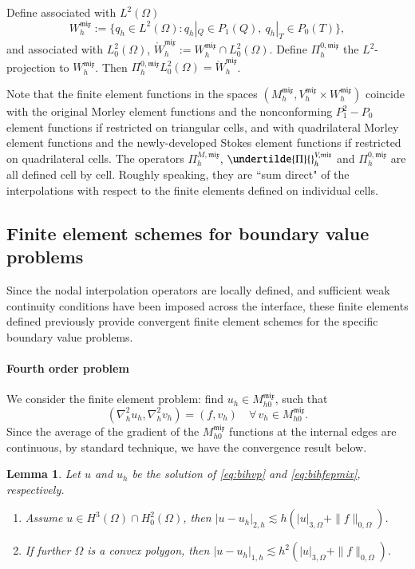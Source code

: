 \documentclass[12pt,showkeys]{amsart}
\newtheorem{lemma}[theorem]{Lemma}
\begin{document}
Define associated with $L^2(\Omega)$
$$
W_h^{\mathfrak{mix}}:=\{q_h\in L^2(\Omega):q_h|_Q\in P_1(Q),\ q_h|_T\in P_0(T)\},
$$
and associated with $L^2_0(\Omega)$, $\mathring{W}_h^{\mathfrak{mix}}:=W_h^{\mathfrak{mix}}\cap L^2_0(\Omega).$ Define $\Pi_h^{0,{\mathfrak{mix}}}$ the $L^2$-projection to $W_h^{\mathfrak{mix}}$. Then $\Pi_h^{0,{\mathfrak{mix}}} L^2_0(\Omega)=\mathring{W}_h^{\mathfrak{mix}}$.

Note that the finite element functions in the spaces $(M_h^{\mathfrak{mix}},V_h^{\mathfrak{mix}}\times W_h^{\mathfrak{mix}})$ coincide with the original Morley element functions and the nonconforming $P_1^2-P_0$ element functions if restricted on triangular cells, and with quadrilateral Morley element functions and the newly-developed Stokes element functions if restricted on quadrilateral cells.  The operators $\Pi_h^{M,{\mathfrak{mix}}}$, $\undertilde{\Pi}{}_h^{V,{\mathfrak{mix}}}$ and $\Pi_h^{0,{\mathfrak{mix}}}$ are all defined cell by cell. Roughly speaking, they are ``sum direct" of the interpolations with respect to the finite elements defined on individual cells.

\subsection{Finite element schemes for boundary value problems}

Since the nodal interpolation operators are locally defined, and sufficient weak continuity conditions have been imposed across the interface, these finite elements defined previously provide convergent finite element schemes for the specific boundary value problems. 

\paragraph{\textbf{Fourth order problem}} We consider the finite element problem: find $u_h\in M_{h0}^{\mathfrak{mix}}$, such that
\begin{equation}\label{eq:bihfepmix}
(\nabla_h^2u_h,\nabla_h^2v_h)=(f,v_h)\quad\forall\,v_h\in M_{h0}^{\mathfrak{mix}}.
\end{equation}
Since the average of the gradient of the $M_{h0}^{\mathfrak{mix}}$ functions at the internal edges are continuous, by standard technique\cite{Shi.Z1990,Wang.M;Shi.Z;Xu.J2007,Park.C;Sheen.D2013}, we have the convergence result below.
\begin{lemma}\label{lem:morleymix}
Let $u$ and $u_h$ be the solution of \eqref{eq:bihvp} and \eqref{eq:bihfepmix}, respectively.
\begin{enumerate}
\item Assume $u\in H^3(\Omega)\cap H^2_0(\Omega)$, then $|u-u_h|_{2,h}\lesssim h(|u|_{3,\Omega}+\|f\|_{0,\Omega})$.
\item If further $\Omega$ is a convex polygon, then $|u-u_h|_{1,h}\lesssim h^2(|u|_{3,\Omega}+\|f\|_{0,\Omega})$.
\end{enumerate}
\end{lemma}
\end{document}
